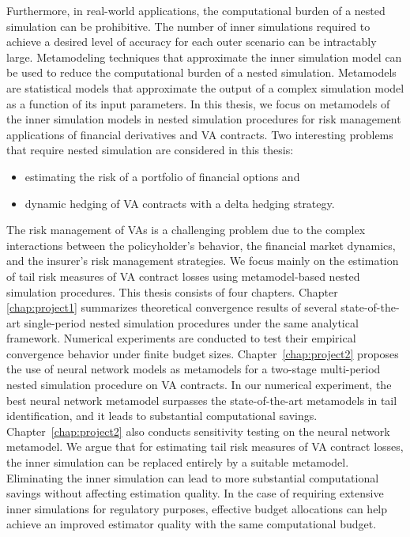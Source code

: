 Furthermore, in real-world applications, the computational burden of a nested simulation can be prohibitive.
The number of inner simulations required to achieve a desired level of accuracy for each outer scenario can be intractably large.
Metamodeling techniques that approximate the inner simulation model can be used to reduce the computational burden of a nested simulation.
Metamodels are statistical models that approximate the output of a complex simulation model as a function of its input parameters.
In this thesis, we focus on metamodels of the inner simulation models in nested simulation procedures for risk management applications of financial derivatives and VA contracts.
Two interesting problems that require nested simulation are considered in this thesis:  
\begin{itemize}
    \item estimating the risk of a portfolio of financial options and 
    \item dynamic hedging of VA contracts with a delta hedging strategy.
\end{itemize}
The risk management of VAs is a challenging problem due to the complex interactions between the policyholder's behavior, the financial market dynamics, and the insurer's risk management strategies.
We focus mainly on the estimation of tail risk measures of VA contract losses using metamodel-based nested simulation procedures.
This thesis consists of four chapters. 
Chapter \ref{chap:project1} summarizes theoretical convergence results of several state-of-the-art single-period nested simulation procedures under the same analytical framework. 
Numerical experiments are conducted to test their empirical convergence behavior under finite budget sizes.
Chapter~\ref{chap:project2} proposes the use of neural network models as metamodels for a two-stage multi-period nested simulation procedure on VA contracts. 
In our numerical experiment, the best neural network metamodel surpasses the state-of-the-art metamodels in tail identification, and it leads to substantial computational savings. 
Chapter~\ref{chap:project2} also conducts sensitivity testing on the neural network metamodel. 
We argue that for estimating tail risk measures of VA contract losses, the inner simulation can be replaced entirely by a suitable metamodel. 
Eliminating the inner simulation can lead to more substantial computational savings without affecting estimation quality. 
In the case of requiring extensive inner simulations for regulatory purposes, effective budget allocations can help achieve an improved estimator quality with the same computational budget.
